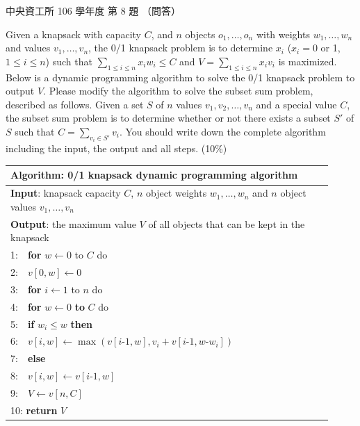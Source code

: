 \begin{pastexam}[label={px:ncu-106-dsa-08}]{中央資工所 106 學年度 第 8 題}
（問答）

Given a knapsack with capacity $C$, and $n$ objects $o_1,\ldots,o_n$ with weights
$w_1,\ldots,w_n$ and values $v_1,\ldots,v_n$, the 0/1 knapsack problem is to determine $x_i$
($x_i=0$ or 1, $1\le i\le n$) such that $\sum_{1\le i\le n}x_iw_i\le C$ and
$V=\sum_{1\le i\le n}x_iv_i$ is maximized. Below is a dynamic programming algorithm to solve the
0/1 knapsack problem to output $V$. Please modify the algorithm to solve the subset sum problem,
described as follows. Given a set $S$ of $n$ values $v_1, v_2, \ldots, v_n$ and a special value
$C$, the subset sum problem is to determine whether or not there exists a subset $S'$ of $S$ such
that $C=\sum_{v_i\in S'}v_i$. You should write down the complete algorithm including the input,
the output and all steps. (10\%)

\begin{center}
\small
\begin{tabular}{|p{0.92\linewidth}|}
\hline
\textbf{Algorithm:} 0/1 knapsack dynamic programming algorithm\\ \hline
\textbf{Input}: knapsack capacity $C$, $n$ object weights $w_1,\ldots,w_n$ and $n$ object values $v_1,\ldots,v_n$\\
\textbf{Output}: the maximum value $V$ of all objects that can be kept in the knapsack\\ \hline
1:\ \ \textbf{for} $w\leftarrow 0$ to $C$ do\\
2:\ \ \hspace*{1.5em}$v[0, w]\leftarrow 0$\\
3:\ \ \textbf{for} $i\leftarrow 1$ to $n$ do\\
4:\ \ \hspace*{1.5em}\textbf{for} $w\leftarrow 0$ \textbf{to} $C$ do\\
5:\ \ \hspace*{3em}\textbf{if} $w_i\le w$ \textbf{then}\\
6:\ \ \hspace*{4.5em}$v[i, w]\leftarrow\max(v[i\text{-}1, w], v_i+v[i\text{-}1, w\text{-}w_i])$\\
7:\ \ \hspace*{3em}\textbf{else}\\
8:\ \ \hspace*{4.5em}$v[i, w]\leftarrow v[i\text{-}1, w]$\\
9:\ \ $V\leftarrow v[n, C]$\\
10: \textbf{return} $V$\\ \hline
\end{tabular}
\end{center}
\end{pastexam}

